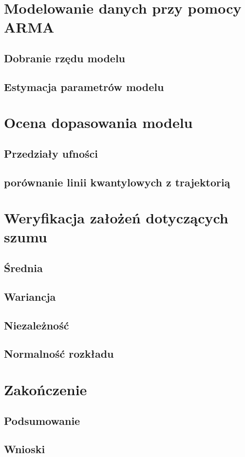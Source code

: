 \documentclass[12pt]{article}
\begin{document}
\section{Modelowanie danych przy pomocy ARMA}
\subsection{Dobranie rzędu modelu}
\subsection{Estymacja parametrów modelu}

\section{Ocena dopasowania modelu}
\subsection{Przedziały ufności}
\subsection{ porównanie linii kwantylowych z trajektorią}


\section{Weryfikacja założeń dotyczących szumu}
\subsection{Średnia}
\subsection{Wariancja}
\subsection{Niezależność}
\subsection{Normalność rozkładu}


\section{Zakończenie}
\subsection{Podsumowanie}
\subsection{Wnioski}
\end{document}
